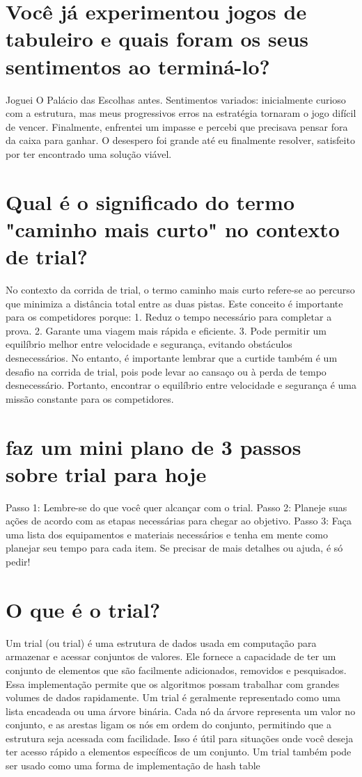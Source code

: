 \documentclass[11pt,a4paper]{article}
\begin{document}
\section{Você já experimentou jogos de tabuleiro e quais foram os seus sentimentos ao terminá-lo?}
Joguei O Palácio das Escolhas antes. Sentimentos variados: inicialmente curioso com a estrutura, mas meus progressivos erros na estratégia tornaram o jogo difícil de vencer. Finalmente, enfrentei um impasse e percebi que precisava pensar fora da caixa para ganhar. O desespero foi grande até eu finalmente resolver, satisfeito por ter encontrado uma solução viável.

\section{Qual é o significado do termo "caminho mais curto" no contexto de trial?}
No contexto da corrida de trial, o termo caminho mais curto refere-se ao percurso que minimiza a distância total entre as duas pistas. Este conceito é importante para os competidores porque: 1. Reduz o tempo necessário para completar a prova. 2. Garante uma viagem mais rápida e eficiente. 3. Pode permitir um equilíbrio melhor entre velocidade e segurança, evitando obstáculos desnecessários. No entanto, é importante lembrar que a curtide também é um desafio na corrida de trial, pois pode levar ao cansaço ou à perda de tempo desnecessário. Portanto, encontrar o equilíbrio entre velocidade e segurança é uma missão constante para os competidores.

\section{faz um mini plano de 3 passos sobre trial para hoje}
Passo 1: Lembre-se do que você quer alcançar com o trial. Passo 2: Planeje suas ações de acordo com as etapas necessárias para chegar ao objetivo. Passo 3: Faça uma lista dos equipamentos e materiais necessários e tenha em mente como planejar seu tempo para cada item. Se precisar de mais detalhes ou ajuda, é só pedir!

\section{O que é o trial?}
Um trial (ou trial) é uma estrutura de dados usada em computação para armazenar e acessar conjuntos de valores. Ele fornece a capacidade de ter um conjunto de elementos que são facilmente adicionados, removidos e pesquisados. Essa implementação permite que os algoritmos possam trabalhar com grandes volumes de dados rapidamente. Um trial é geralmente representado como uma lista encadeada ou uma árvore binária. Cada nó da árvore representa um valor no conjunto, e as arestas ligam os nós em ordem do conjunto, permitindo que a estrutura seja acessada com facilidade. Isso é útil para situações onde você deseja ter acesso rápido a elementos específicos de um conjunto. Um trial também pode ser usado como uma forma de implementação de hash table
\end{document}
